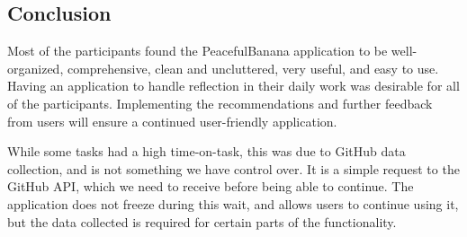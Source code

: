 \subsection{Conclusion}
Most of the participants found the PeacefulBanana application to be well-organized, comprehensive, clean and uncluttered, very useful, and easy to use. Having an application to handle reflection in their daily work was desirable for all of the participants. Implementing the recommendations and further feedback from users will ensure a continued user-friendly application.

While some tasks had a high time-on-task, this was due to GitHub data collection, and is not something we have control over. It is a simple request to the GitHub API, which we need to receive before being able to continue. The application does not freeze during this wait, and allows users to continue using it, but the data collected is required for certain parts of the functionality.  
